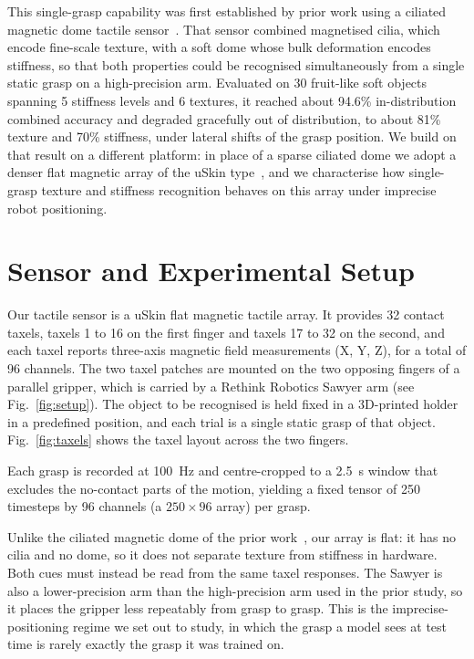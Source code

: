 \documentclass[journal]{IEEEtran}
\begin{document}
%
This single-grasp capability was first established by prior work using a ciliated magnetic dome tactile sensor~\cite{cmd_source}. That sensor combined magnetised cilia, which encode fine-scale texture, with a soft dome whose bulk deformation encodes stiffness, so that both properties could be recognised simultaneously from a single static grasp on a high-precision arm. Evaluated on 30 fruit-like soft objects spanning 5 stiffness levels and 6 textures, it reached about 94.6\% in-distribution combined accuracy and degraded gracefully out of distribution, to about 81\% texture and 70\% stiffness, under lateral shifts of the grasp position. We build on that result on a different platform: in place of a sparse ciliated dome we adopt a denser flat magnetic array of the uSkin type~\cite{tomo2018uSkin,funabashi24tacObjRec}, and we characterise how single-grasp texture and stiffness recognition behaves on this array under imprecise robot positioning.


%
\section{Sensor and Experimental Setup}
\label{sec:Setup}
%
Our tactile sensor is a uSkin flat magnetic tactile array. It provides 32 contact taxels, taxels 1 to 16 on the first finger and taxels 17 to 32 on the second, and each taxel reports three-axis magnetic field measurements (X, Y, Z), for a total of 96 channels. The two taxel patches are mounted on the two opposing fingers of a parallel gripper, which is carried by a Rethink Robotics Sawyer arm (see Fig.~\ref{fig:setup}). The object to be recognised is held fixed in a 3D-printed holder in a predefined position, and each trial is a single static grasp of that object. Fig.~\ref{fig:taxels} shows the taxel layout across the two fingers.
%

%
Each grasp is recorded at 100~Hz and centre-cropped to a 2.5~s window that excludes the no-contact parts of the motion, yielding a fixed tensor of 250 timesteps by 96 channels (a $250 \times 96$ array) per grasp. %
%

%
Unlike the ciliated magnetic dome of the prior work~\cite{cmd_source}, our array is flat: it has no cilia and no dome, so it does not separate texture from stiffness in hardware. Both cues must instead be read from the same taxel responses. The Sawyer is also a lower-precision arm than the high-precision arm used in the prior study, so it places the gripper less repeatably from grasp to grasp. This is the imprecise-positioning regime we set out to study, in which the grasp a model sees at test time is rarely exactly the grasp it was trained on.
%
\end{document}
